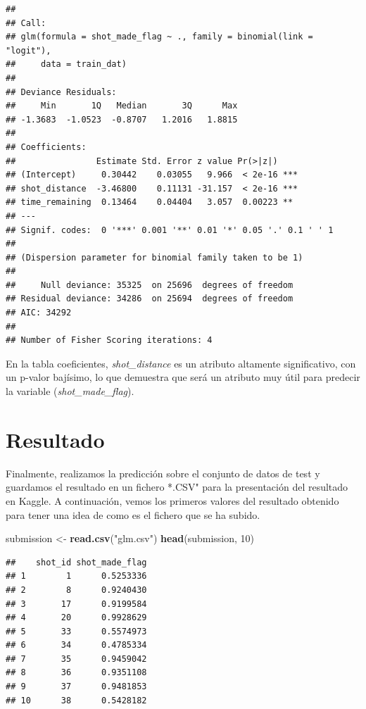 \documentclass[
]{article}
\newenvironment{Shaded}{\begin{snugshade}}{\end{snugshade}}
\newcommand{\DecValTok}[1]{\textcolor[rgb]{0.00,0.00,0.81}{#1}}
\newcommand{\KeywordTok}[1]{\textcolor[rgb]{0.13,0.29,0.53}{\textbf{#1}}}
\newcommand{\NormalTok}[1]{#1}
\newcommand{\StringTok}[1]{\textcolor[rgb]{0.31,0.60,0.02}{#1}}
\begin{document}
\begin{verbatim}
## 
## Call:
## glm(formula = shot_made_flag ~ ., family = binomial(link = "logit"), 
##     data = train_dat)
## 
## Deviance Residuals: 
##     Min       1Q   Median       3Q      Max  
## -1.3683  -1.0523  -0.8707   1.2016   1.8815  
## 
## Coefficients:
##                Estimate Std. Error z value Pr(>|z|)    
## (Intercept)     0.30442    0.03055   9.966  < 2e-16 ***
## shot_distance  -3.46800    0.11131 -31.157  < 2e-16 ***
## time_remaining  0.13464    0.04404   3.057  0.00223 ** 
## ---
## Signif. codes:  0 '***' 0.001 '**' 0.01 '*' 0.05 '.' 0.1 ' ' 1
## 
## (Dispersion parameter for binomial family taken to be 1)
## 
##     Null deviance: 35325  on 25696  degrees of freedom
## Residual deviance: 34286  on 25694  degrees of freedom
## AIC: 34292
## 
## Number of Fisher Scoring iterations: 4
\end{verbatim}

En la tabla coeficientes, \emph{shot\_distance} es un atributo altamente
significativo, con un p-valor bajísimo, lo que demuestra que será un
atributo muy útil para predecir la variable (\emph{shot\_made\_flag}).

\hypertarget{resultado}{%
\section{\texorpdfstring{\textbf{Resultado}}{Resultado}}\label{resultado}}

Finalmente, realizamos la predicción sobre el conjunto de datos de test
y guardamos el resultado en un fichero *.CSV" para la presentación del
resultado en Kaggle. A continuación, vemos los primeros valores del
resultado obtenido para tener una idea de como es el fichero que se ha
subido.

\begin{Shaded}
\begin{Highlighting}[]
\NormalTok{submission <-}\StringTok{ }\KeywordTok{read.csv}\NormalTok{(}\StringTok{"glm.csv"}\NormalTok{)}
\KeywordTok{head}\NormalTok{(submission, }\DecValTok{10}\NormalTok{)}
\end{Highlighting}
\end{Shaded}

\begin{verbatim}
##    shot_id shot_made_flag
## 1        1      0.5253336
## 2        8      0.9240430
## 3       17      0.9199584
## 4       20      0.9928629
## 5       33      0.5574973
## 6       34      0.4785334
## 7       35      0.9459042
## 8       36      0.9351108
## 9       37      0.9481853
## 10      38      0.5428182
\end{verbatim}
\end{document}

